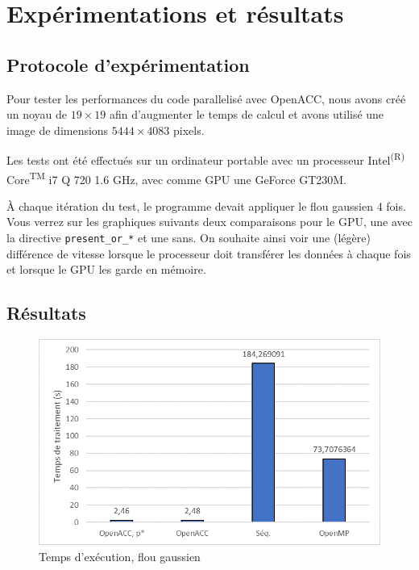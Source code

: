 \documentclass[11pt]{report}
\begin{document}
	\section{Expérimentations et résultats}

		\subsection{Protocole d'expérimentation}
				Pour tester les performances du code parallelisé avec OpenACC, nous avons créé un noyau de $19 \times 19$ afin d'augmenter le temps de calcul et avons utilisé une image de dimensions $5444 \times 4083$ pixels.
		
		\bigskip
		Les tests ont été effectués sur un ordinateur portable avec un processeur Intel\textsuperscript{(R)} Core\textsuperscript{TM} i7 Q 720 \@ 1.6 GHz, avec comme GPU une GeForce GT230M.
		
		À chaque itération du test, le programme devait appliquer le flou gaussien 4 fois. Vous verrez sur les graphiques suivants deux comparaisons pour le GPU, une avec la directive \texttt{present\_or\_*} et une sans. On souhaite ainsi voir une (légère) différence de vitesse lorsque le processeur doit transférer les données à chaque fois et lorsque le GPU les garde en mémoire.
		
		\subsection{Résultats}
		
		\begin{figure}[H]
			\centering
			\includegraphics[scale=0.8]{images/graph_temps}
			\caption{Temps d'exécution, flou gaussien}
		\end{figure}
		
\end{document}

